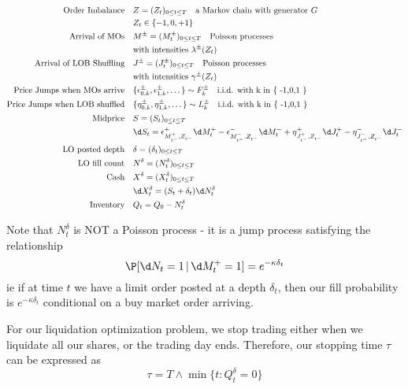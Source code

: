 \documentclass[12pt]{article}
\begin{document}
\begin{align*}
\text{Order Imbalance} \quad & Z = (Z_t)_{0 \leq t \leq T} \quad \text{a Markov chain with generator } G \\
& Z_t \in \{ -1, 0, +1 \} \\
\text{Arrival of MOs} \quad & M^{\pm} = (M^{\pm}_t)_{0 \leq t \leq T} \quad \text{Poisson processes} \\
& \text{with intensities } \lambda^{\pm}(Z_t) \\
\text{Arrival of LOB Shuffling} \quad & J^{\pm} = (J^{\pm}_t)_{0 \leq t \leq T} \quad \text{Poisson processes} \\
& \text{with intensities } \gamma^{\pm}(Z_t) \\
\text{Price Jumps when MOs arrive} \quad & \{ \epsilon^\pm_{0,k}, \epsilon^\pm_{1,k}, \dots \} \sim F^\pm_k \quad \text{i.i.d. with k in \{ -1,0,1 \} } \\
\text{Price Jumps when LOB shuffled} \quad & \{ \eta^\pm_{0,k}, \eta^\pm_{1,k}, \dots \} \sim L^\pm_k \quad \text{i.i.d. with k in \{ -1,0,1 \} } \\
\text{Midprice} \quad & S = (S_t)_{0 \leq t \leq T} \\
& \d S_t = \epsilon^+_{M^+_{t^-},Z_{t^-}} \d M^+_t - \epsilon^-_{M^-_{t^-},Z_{t^-}} \d M^-_t + \eta^+_{J^+_{t^-},Z_{t^-}} \d J^+_t - \eta^-_{J^-_{t^-},Z_{t^-}} \d J^-_t\\
\text{LO posted depth} \quad & \delta = (\delta_t)_{0 \leq t \leq T} \\
\text{LO fill count} \quad & N^{\delta} = (N^{\delta}_t)_{0 \leq t \leq T} \\
\text{Cash} \quad & X^{\delta} = (X^{\delta}_t)_{0 \leq t \leq T} \\
& \d X^{\delta}_t = (S_t + \delta_t) \d N^{\delta}_t \\
\text{Inventory} \quad & Q_t = Q_0 - N_t^\delta \\
\end{align*}

Note that $N^{\delta}_t$ is NOT a Poisson process - it is a jump process satisfying the relationship
\[ \P [\d N_t = 1 \, | \, \d M^+_t = 1] = e^{-\kappa \delta_t} \]
ie if at time $t$ we have a limit order posted at a depth $\delta_t$, then our fill probability is $e^{-\kappa \delta_t}$ conditional on a buy market order arriving. 

For our liquidation optimization problem, we stop trading either when we liquidate all our shares, or the trading day ends. Therefore, our stopping time $\tau$ can be expressed as 
\[ \tau = T \wedge \min \{ t: Q_t^\delta = 0 \} \]
\end{document}
